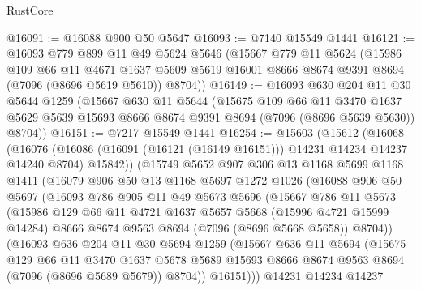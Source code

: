 \begin{lexlean}{RustCore}
\begin{coremodule}
@16091 := @16088 @900 @50 @5647
@16093 := @7140 @15549 @1441
@16121 := @16093
    @779
    @899
    @11
    @49
    @5624
    @5646
    (@15667
      @779
      @11
      @5624
      (@15986
        @109
        @66
        @11
        @4671
        @1637
        @5609
        @5619
        @16001
        @8666
        @8674
        @9391
        @8694
        (@7096 (@8696 @5619 @5610))
        @8704))
@16149 := @16093
    @630
    @204
    @11
    @30
    @5644
    @1259
    (@15667
      @630
      @11
      @5644
      (@15675
        @109
        @66
        @11
        @3470
        @1637
        @5629
        @5639
        @15693
        @8666
        @8674
        @9391
        @8694
        (@7096 (@8696 @5639 @5630))
        @8704))
@16151 := @7217 @15549 @1441
@16254 := @15603
    (@15612
      (@16068
        (@16076
          (@16086 (@16091 (@16121 (@16149 @16151))) @14231 @14234 @14237 @14240 @8704)
          @15842))
      (@15749
        @5652
        @907
        @306
        @13
        @1168
        @5699
        @1168
        @1411
        (@16079
          @906
          @50
          @13
          @1168
          @5697
          @1272
          @1026
          (@16088
            @906
            @50
            @5697
            (@16093
              @786
              @905
              @11
              @49
              @5673
              @5696
              (@15667
                @786
                @11
                @5673
                (@15986
                  @129
                  @66
                  @11
                  @4721
                  @1637
                  @5657
                  @5668
                  (@15996 @4721 @15999 @14284)
                  @8666
                  @8674
                  @9563
                  @8694
                  (@7096 (@8696 @5668 @5658))
                  @8704))
              (@16093
                @636
                @204
                @11
                @30
                @5694
                @1259
                (@15667
                  @636
                  @11
                  @5694
                  (@15675
                    @129
                    @66
                    @11
                    @3470
                    @1637
                    @5678
                    @5689
                    @15693
                    @8666
                    @8674
                    @9563
                    @8694
                    (@7096 (@8696 @5689 @5679))
                    @8704))
                @16151)))
          @14231
          @14234
          @14237

\end{coremodule}
\end{lexlean}
